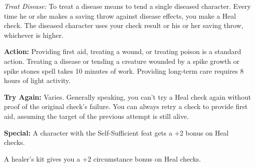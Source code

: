 \textit{Treat Disease:} To treat a disease means to tend a single diseased character. Every time he or she makes a saving throw against disease effects, you make a Heal check. The diseased character uses your check result or his or her saving throw, whichever is higher.

\textbf{Action:} Providing first aid, treating a wound, or treating poison is a standard action. Treating a disease or tending a creature wounded by a spike growth or spike stones spell takes 10 minutes of work. Providing long-term care requires 8 hours of light activity.

\textbf{Try Again:} Varies. Generally speaking, you can't try a Heal check again without proof of the original check's failure. You can always retry a check to provide first aid, assuming the target of the previous attempt is still alive.

\textbf{Special:} A character with the Self-Sufficient feat gets a +2 bonus on Heal checks.

A healer's kit gives you a +2 circumstance bonus on Heal checks.